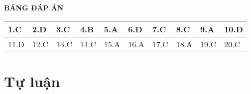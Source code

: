 \hideall
{
	\begin{center}
		\textbf{BẢNG ĐÁP ÁN}
	\end{center}
	\begin{center}
		\begin{tabular}{|m{2.8em}|m{2.8em}|m{2.8em}|m{2.8em}|m{2.8em}|m{2.8em}|m{2.8em}|m{2.8em}|m{2.8em}|m{2.8em}|}
			\hline
			1.C  & 2.D  & 3.C  & 4.B  & 5.A  & 6.D  & 7.C  & 8.C  & 9.A  & 10.D  \\
			\hline
			11.D  & 12.C  & 13.C  & 14.C  & 15.A  & 16.A  & 17.C  & 18.A  & 19.C  & 20.C  \\
			\hline
			
		\end{tabular}
	\end{center}
}
\section{Tự luận}
